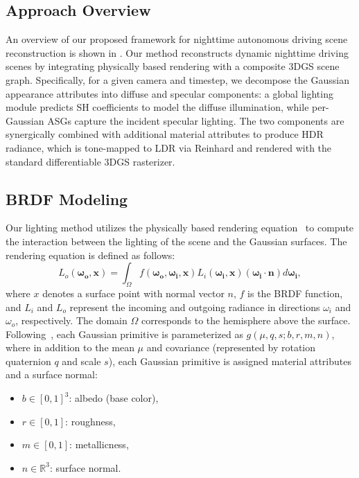 \documentclass[letterpaper, 10 pt, conference]{ieeeconf}  %
\begin{document}
\subsection{Approach Overview}
An overview of our proposed framework for nighttime autonomous driving scene reconstruction is shown in .
Our method reconstructs dynamic nighttime driving scenes by integrating physically based rendering with a composite 3DGS scene graph. Specifically, for a given camera and timestep, we decompose the Gaussian appearance attributes into diffuse and specular components: a global lighting module predicts SH coefficients to model the diffuse illumination, while per-Gaussian ASGs capture the incident specular lighting. The two components are synergically combined with additional material attributes to produce HDR radiance, which is tone-mapped to LDR via Reinhard and rendered with the standard differentiable 3DGS rasterizer.



\subsection{BRDF Modeling}
Our lighting method utilizes the physically based rendering equation~\cite{kajiya1986rendering} to compute the interaction between the lighting of the scene and the Gaussian surfaces. The rendering equation is defined as follows:
\begin{equation}
     L_{o}(\boldsymbol {\omega _{o}}, \boldsymbol {x}) = \int _{\Omega }f(\boldsymbol {\omega _{o}}, \boldsymbol {\omega _{i}}, \boldsymbol {x})L_{i}(\boldsymbol {\omega _{i}}, \boldsymbol {x})(\boldsymbol {\omega _{i}}\cdot \boldsymbol {n})d\boldsymbol {\omega _{i}}, \label {eq:rendering_equation}
\end{equation}
where $x$ denotes a surface point with normal vector $n$, $f$ is the BRDF function, and $L_i$ and $L_o$ represent the incoming and outgoing radiance in directions $\omega_i$ and $\omega_o$, respectively. The domain $\Omega$ corresponds to the hemisphere above the surface.
%
Following~\cite{gao2024relightable}, each Gaussian primitive is parameterized as $g(\mu,q,s; b,r,m,n)$, where in addition to the mean $\mu$ and covariance (represented by rotation quaternion $q$ and scale $s$), each Gaussian primitive is assigned material attributes and a surface normal:
\begin{itemize}
    \item $b \in [0,1]^3$: albedo (base color),
    \item $r \in [0,1]$: roughness,
    \item $m \in [0,1]$: metallicness,
    \item $n \in \mathbb{R}^3$: surface normal.
\end{itemize}
\end{document}
